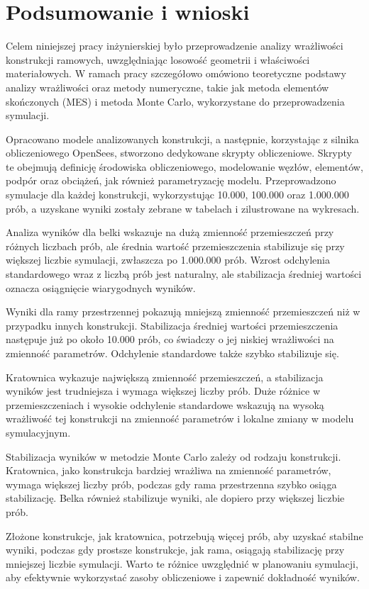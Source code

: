 \section{Podsumowanie i wnioski}

Celem niniejszej pracy inżynierskiej było przeprowadzenie analizy wrażliwości konstrukcji ramowych, uwzględniając losowość geometrii i właściwości materiałowych.
W ramach pracy szczegółowo omówiono teoretyczne podstawy analizy wrażliwości oraz metody numeryczne, takie jak metoda elementów skończonych (MES) i metoda Monte Carlo, wykorzystane do przeprowadzenia symulacji.

Opracowano modele analizowanych konstrukcji, a następnie, korzystając z silnika obliczeniowego OpenSees, stworzono dedykowane skrypty obliczeniowe.
Skrypty te obejmują definicję środowiska obliczeniowego, modelowanie węzłów, elementów, podpór oraz obciążeń, jak również parametryzację modelu.
Przeprowadzono symulacje dla każdej konstrukcji, wykorzystując 10.000, 100.000 oraz 1.000.000 prób, a uzyskane wyniki zostały zebrane w tabelach i zilustrowane na wykresach.

Analiza wyników dla belki wskazuje na dużą zmienność przemieszczeń przy różnych liczbach prób, ale średnia wartość przemieszczenia stabilizuje się przy większej liczbie symulacji, zwłaszcza po 1.000.000 prób.
Wzrost odchylenia standardowego wraz z liczbą prób jest naturalny, ale stabilizacja średniej wartości oznacza osiągnięcie wiarygodnych wyników.

Wyniki dla ramy przestrzennej pokazują mniejszą zmienność przemieszczeń niż w przypadku innych konstrukcji.
Stabilizacja średniej wartości przemieszczenia następuje już po około 10.000 prób, co świadczy o jej niskiej wrażliwości na zmienność parametrów.
Odchylenie standardowe także szybko stabilizuje się.

Kratownica wykazuje największą zmienność przemieszczeń, a stabilizacja wyników jest trudniejsza i wymaga większej liczby prób.
Duże różnice w przemieszczeniach i wysokie odchylenie standardowe wskazują na wysoką wrażliwość tej konstrukcji na zmienność parametrów i lokalne zmiany w modelu symulacyjnym.

Stabilizacja wyników w metodzie Monte Carlo zależy od rodzaju konstrukcji.
Kratownica, jako konstrukcja bardziej wrażliwa na zmienność parametrów, wymaga większej liczby prób, podczas gdy rama przestrzenna szybko osiąga stabilizację.
Belka również stabilizuje wyniki, ale dopiero przy większej liczbie prób.

Złożone konstrukcje, jak kratownica, potrzebują więcej prób, aby uzyskać stabilne wyniki, podczas gdy prostsze konstrukcje, jak rama, osiągają stabilizację przy mniejszej liczbie symulacji.
Warto te różnice uwzględnić w planowaniu symulacji, aby efektywnie wykorzystać zasoby obliczeniowe i zapewnić dokładność wyników.

